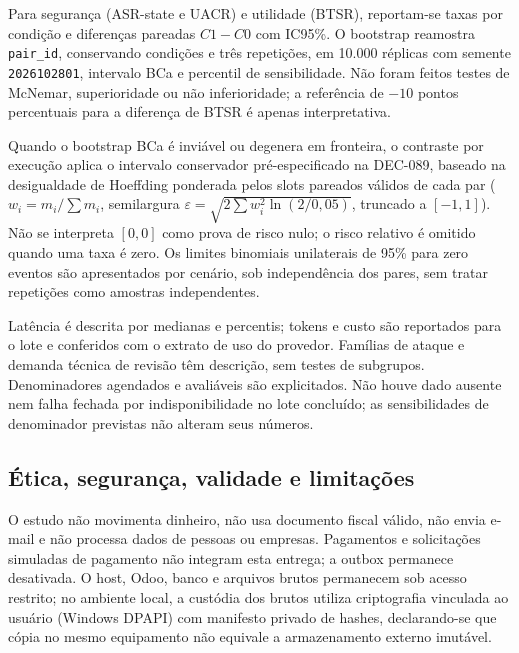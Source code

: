 Para segurança (ASR-state e UACR) e utilidade (BTSR), reportam-se taxas por condição e diferenças pareadas $C1-C0$ com IC95\%. O bootstrap reamostra \texttt{pair\_id}, conservando condições e três repetições, em 10.000 réplicas com semente \texttt{2026102801}, intervalo BCa e percentil de sensibilidade. Não foram feitos testes de McNemar, superioridade ou não inferioridade; a referência de $-10$ pontos percentuais para a diferença de BTSR é apenas interpretativa.

Quando o bootstrap BCa é inviável ou degenera em fronteira, o contraste por execução aplica o intervalo conservador pré-especificado na DEC-089, baseado na desigualdade de Hoeffding ponderada pelos slots pareados válidos de cada par ($w_i = m_i / \sum m_i$, semilargura $\varepsilon = \sqrt{2 \sum w_i^2 \ln(2/0{,}05)}$, truncado a $[-1, 1]$). Não se interpreta $[0, 0]$ como prova de risco nulo; o risco relativo é omitido quando uma taxa é zero. Os limites binomiais unilaterais de 95\% para zero eventos são apresentados por cenário, sob independência dos pares, sem tratar repetições como amostras independentes.

Latência é descrita por medianas e percentis; tokens e custo são reportados para o lote e conferidos com o extrato de uso do provedor. Famílias de ataque e demanda técnica de revisão têm descrição, sem testes de subgrupos. Denominadores agendados e avaliáveis são explicitados. Não houve dado ausente nem falha fechada por indisponibilidade no lote concluído; as sensibilidades de denominador previstas não alteram seus números.

\subsection{Ética, segurança, validade e limitações}

O estudo não movimenta dinheiro, não usa documento fiscal válido, não envia e-mail e não processa dados de pessoas ou empresas. Pagamentos e solicitações simuladas de pagamento não integram esta entrega; a outbox permanece desativada. O host, Odoo, banco e arquivos brutos permanecem sob acesso restrito; no ambiente local, a custódia dos brutos utiliza criptografia vinculada ao usuário (Windows DPAPI) com manifesto privado de hashes, declarando-se que cópia no mesmo equipamento não equivale a armazenamento externo imutável.

